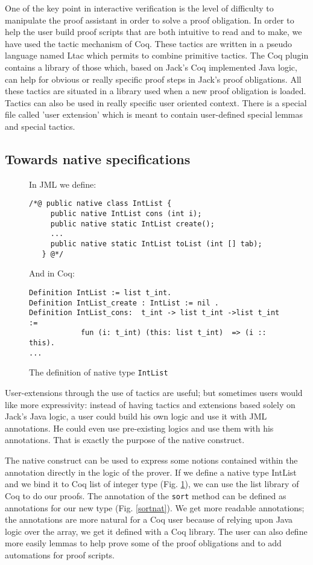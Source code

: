 One of the key point in interactive verification is the level of difficulty
to manipulate the proof assistant in order to solve a proof obligation.
In order to help the user build proof scripts that are both intuitive
to read and to make, we have used the tactic mechanism of Coq.
These tactics are written in a pseudo language named Ltac \cite{DEL-00-LTAC}
which permits to combine primitive tactics.
The Coq plugin contains a library of those which, based on Jack's Coq 
implemented Java logic, can help for obvious or really specific proof steps
in Jack's proof obligations. All these tactics are situated in a library 
used when a new proof obligation is loaded. Tactics can also be used in 
really specific user oriented context. There is a special file called 
'user extension' which is meant to contain user-defined
special lemmas and special tactics.



\subsection{Towards native specifications}
\begin{figure}[t!]
{\small In JML we define:
\begin{verbatim}
/*@ public native class IntList {
     public native IntList cons (int i);
     public native static IntList create();
     ...
     public native static IntList toList (int [] tab);
   } @*/ \end{verbatim}}

{\small And in Coq:
\begin{verbatim}
Definition IntList := list t_int.
Definition IntList_create : IntList := nil .  
Definition IntList_cons:  t_int -> list t_int ->list t_int := 
            fun (i: t_int) (this: list t_int)  => (i :: this).
... \end{verbatim}}
\caption{The definition of native type \texttt{IntList}}\label{CoqAnnot} 
\end{figure}
User-extensions through the use of tactics are useful;
but sometimes users would like more expressivity: instead of having
tactics and extensions based solely on Jack's Java logic, a user could
build his own logic and use it with JML annotations. He could 
even use pre-existing logics and use them with his annotations. That is 
exactly the purpose of the native construct.


The native construct can be used to express some notions contained within
the annotation directly in the logic of the prover. If we define a native type 
IntList and we bind it to Coq list of integer type (Fig. \ref{CoqAnnot}), 
we can use the list library of Coq to do our proofs. The annotation of the
{\tt sort} method can be defined as annotations for our new type 
(Fig. \ref{sortnat}). We get more readable annotations;
the annotations are more natural for a Coq user because of relying upon Java
logic over the array, we get it defined with a Coq library.
The user can also define more easily lemmas to help prove some of the proof
obligations and to add automations for proof scripts.


